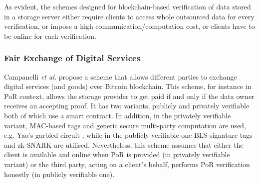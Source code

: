 As evident,  the schemes designed for  blockchain-based verification of data stored in a storage server either require clients to access  whole outsourced data for  every verification, or impose a high communication/computation cost, or  clients have to be online for each verification. 

 \subsubsection{Fair Exchange of Digital Services}
 
 Campanelli \textit{et al.}  \cite{CampanelliGGN17} propose a scheme that allows different parties to exchange digital services (and goods) over Bitcoin blockchain. This scheme, for instance in PoR context, allows the storage provider to get paid  if and only if the data owner receives an accepting proof. It has two variants, publicly and  privately verifiable both of which use a smart contract.   In addition, in the privately verifiable variant,  MAC-based tags and generic secure multi-party computation are used, e.g. Yao's garbled circuit \cite{Yao82b}, while in the publicly verifiable one  BLS signature tags and zk-SNARK are utilised.  Nevertheless, this scheme assumes that either the client is  available and online when PoR is provided (in privately verifiable variant) or the third party, acting on a client's behalf, performs PoR verification honestly (in publicly verifiable one). 












